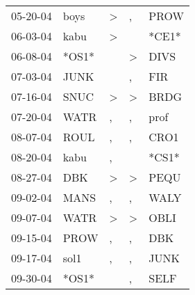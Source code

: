 \begin{supertabular}{p{0.07\textwidth}p{0.06\textwidth}p{0.02\textwidth}p{0.02\textwidth}p{0.06\textwidth}}
          05-20-04\textsuperscript{} &           boys\textsuperscript{} &     \textgreater &                , &           PROW\textsuperscript{} \\
          06-03-04\textsuperscript{} &           kabu\textsuperscript{} &     \textgreater &                  &                            *CE1* \\
          06-08-04\textsuperscript{} &                            *OS1* &                  &     \textgreater &           DIVS\textsuperscript{} \\
          07-03-04\textsuperscript{} &           JUNK\textsuperscript{} &                  &                , &            FIR\textsuperscript{} \\
          07-16-04\textsuperscript{} &           SNUC\textsuperscript{} &     \textgreater &     \textgreater &           BRDG\textsuperscript{} \\
          07-20-04\textsuperscript{} &           WATR\textsuperscript{} &                , &                , &           prof\textsuperscript{} \\
          08-07-04\textsuperscript{} &           ROUL\textsuperscript{} &                , &                , &           CRO1\textsuperscript{} \\
          08-20-04\textsuperscript{} &           kabu\textsuperscript{} &                , &                  &                            *CS1* \\
          08-27-04\textsuperscript{} &            DBK\textsuperscript{} &     \textgreater &     \textgreater &           PEQU\textsuperscript{} \\
          09-02-04\textsuperscript{} &           MANS\textsuperscript{} &                , &                , &           WALY\textsuperscript{} \\
          09-07-04\textsuperscript{} &           WATR\textsuperscript{} &     \textgreater &     \textgreater &           OBLI\textsuperscript{} \\
          09-15-04\textsuperscript{} &           PROW\textsuperscript{} &                , &                , &            DBK\textsuperscript{} \\
          09-17-04\textsuperscript{} &           sol1\textsuperscript{} &                , &                , &           JUNK\textsuperscript{} \\
          09-30-04\textsuperscript{} &                            *OS1* &                  &                , &           SELF\textsuperscript{} \\

\end{supertabular}
